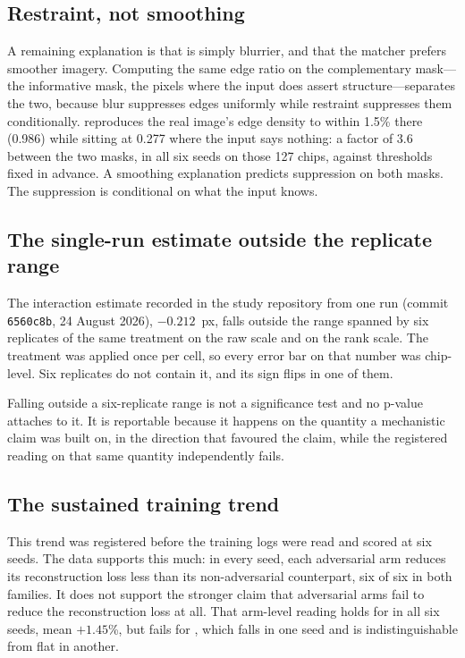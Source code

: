 \subsection{Restraint, not smoothing}

A remaining explanation is that \Lone{} is simply blurrier, and that the matcher prefers
smoother imagery. Computing the same edge ratio on the complementary mask---the informative mask, the
pixels where the input does assert structure---separates the two, because blur suppresses
edges uniformly while restraint suppresses them conditionally. \Lone{} reproduces the
real image's edge density to within 1.5\% there (0.986) while sitting at 0.277
where the input says nothing: a factor of 3.6 between the two masks, in all six seeds on those 127 chips, against
thresholds fixed in advance. A smoothing explanation predicts suppression on both
masks. The suppression is conditional on what the input knows.

\subsection{The single-run estimate outside the replicate range}

The interaction estimate recorded in the study repository from one run (commit
\texttt{6560c8b}, 24 August 2026), $-0.212$~px, falls outside
the range spanned by six replicates of the same treatment on the raw scale and on the
rank scale. The treatment was applied once per cell, so every error bar on that number was
chip-level. Six replicates do not contain it, and its sign flips in one of them.

Falling outside a six-replicate range is not a significance test and no p-value attaches
to it. It is reportable because it happens on the quantity a mechanistic claim was built on, in the direction that favoured the claim, while the registered reading on that
same quantity independently fails.

\subsection{The sustained training trend}

This trend was registered before the training logs were read and scored at six seeds. The
data supports this much: in every seed, each adversarial arm reduces its reconstruction loss
less than its non-adversarial counterpart, six of six in both families. It does not support
the stronger claim that adversarial arms fail to reduce the reconstruction loss at all. That arm-level
reading holds for \advLPIPS{} in all six seeds, mean $+1.45$\%, but fails for
\advLone{}, which falls in one seed and is indistinguishable from flat in another.

